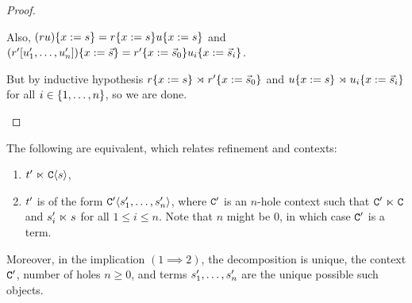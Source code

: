 \begin{proof}
\begin{itemize}
\begin{enumerate}
    Also, $(r u)\{x := s\} =
             r\{x := s\} u\{x := s\}$
    and $(r' [u'_1, \hdots, u'_n])\{x := \vec{s}\}
           = r'\{x := \vec{s}_0\} u_i\{x := \vec{s}_i\}$.

    But by inductive hypothesis
      $r\{x := s\} \mathrel{\rtimes} r'\{x := \vec{s}_0\}$
      and $u\{x := s\} \mathrel{\rtimes} u_i\{x := \vec{s}_i\}$
        for all $i \in \{1, \hdots, n\}$,
    so we are done.
  \end{enumerate}
\end{itemize}
\end{proof}

\begin{lemma}
The following are equivalent, which relates refinement and contexts:
  \begin{enumerate}
  \item $t' \mathrel{\ltimes} \mathtt{C}\langle s\rangle$,
  \item $t'$ is of the form $\mathtt{C}'\langle s'_{1},\hdots,s'_n\rangle$,
        where $\mathtt{C}'$ is an $n$-hole context such that $\mathtt{C}' \mathrel{\ltimes} \mathtt{C}$ and
        $s'_i \mathrel{\ltimes} s$ for all $1 \leq i \leq n$.
        Note that $n$ might be $0$, in which case $\mathtt{C}'$ is a term.
  \end{enumerate}
Moreover, in the implication $(1 \implies 2)$,
the decomposition is unique,
\ie the context $\mathtt{C}'$, number of holes $n \geq 0$, and terms $s'_1,\hdots,s'_n$
are the unique possible such objects.
\end{lemma}

